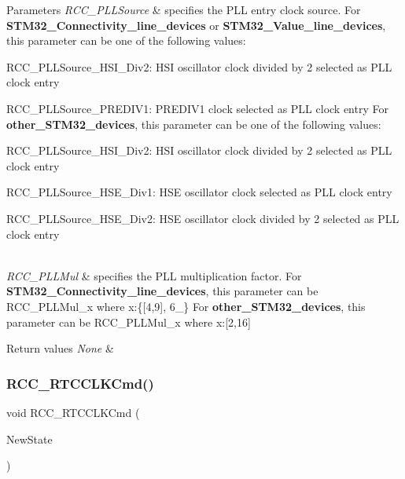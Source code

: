 \begin{DoxyParams}{Parameters}
{\em R\+C\+C\+\_\+\+P\+L\+L\+Source} & specifies the P\+LL entry clock source. For {\bfseries{S\+T\+M32\+\_\+\+Connectivity\+\_\+line\+\_\+devices}} or {\bfseries{S\+T\+M32\+\_\+\+Value\+\_\+line\+\_\+devices}}, this parameter can be one of the following values\+: \begin{DoxyItemize}
\item R\+C\+C\+\_\+\+P\+L\+L\+Source\+\_\+\+H\+S\+I\+\_\+\+Div2\+: H\+SI oscillator clock divided by 2 selected as P\+LL clock entry \item R\+C\+C\+\_\+\+P\+L\+L\+Source\+\_\+\+P\+R\+E\+D\+I\+V1\+: P\+R\+E\+D\+I\+V1 clock selected as P\+LL clock entry For {\bfseries{other\+\_\+\+S\+T\+M32\+\_\+devices}}, this parameter can be one of the following values\+: \item R\+C\+C\+\_\+\+P\+L\+L\+Source\+\_\+\+H\+S\+I\+\_\+\+Div2\+: H\+SI oscillator clock divided by 2 selected as P\+LL clock entry \item R\+C\+C\+\_\+\+P\+L\+L\+Source\+\_\+\+H\+S\+E\+\_\+\+Div1\+: H\+SE oscillator clock selected as P\+LL clock entry \item R\+C\+C\+\_\+\+P\+L\+L\+Source\+\_\+\+H\+S\+E\+\_\+\+Div2\+: H\+SE oscillator clock divided by 2 selected as P\+LL clock entry \end{DoxyItemize}
\\
\hline
{\em R\+C\+C\+\_\+\+P\+L\+L\+Mul} & specifies the P\+LL multiplication factor. For {\bfseries{S\+T\+M32\+\_\+\+Connectivity\+\_\+line\+\_\+devices}}, this parameter can be R\+C\+C\+\_\+\+P\+L\+L\+Mul\+\_\+x where x\+:\{\mbox{[}4,9\mbox{]}, 6\+\_\} For {\bfseries{other\+\_\+\+S\+T\+M32\+\_\+devices}}, this parameter can be R\+C\+C\+\_\+\+P\+L\+L\+Mul\+\_\+x where x\+:\mbox{[}2,16\mbox{]}\\
\hline
\end{DoxyParams}

\begin{DoxyRetVals}{Return values}
{\em None} & \\
\hline
\end{DoxyRetVals}
\mbox{\label{group___r_c_c___private___functions_ga9802f84846df2cea8e369234ed13b159}} 
\subsubsection{\texorpdfstring{RCC\_RTCCLKCmd()}{RCC\_RTCCLKCmd()}}
{\footnotesize\ttfamily void R\+C\+C\+\_\+\+R\+T\+C\+C\+L\+K\+Cmd (\begin{DoxyParamCaption}\item[{\mbox{\hyperlink{group___exported__types_gac9a7e9a35d2513ec15c3b537aaa4fba1}{Functional\+State}}}]{New\+State }\end{DoxyParamCaption})}



